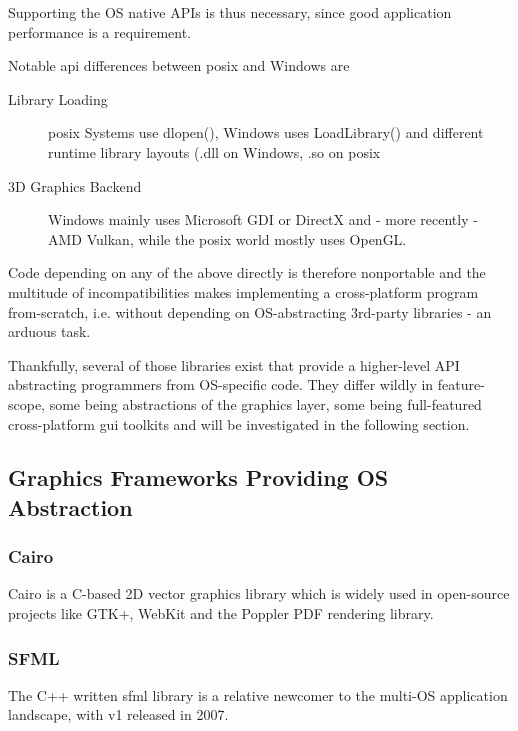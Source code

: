 Supporting the OS native APIs is thus necessary, since good application performance is a requirement.

Notable \gls{api} differences between \gls{posix} and Windows are
\begin{description}
	\item[Library Loading] \gls{posix} Systems use dlopen(), Windows uses LoadLibrary() and different runtime library layouts (.dll on Windows, .so on \gls{posix}
	\item[3D Graphics Backend] Windows mainly uses Microsoft GDI or DirectX and - more recently - AMD Vulkan, while the \gls{posix} world mostly uses OpenGL.
\end{description}

Code depending on any of the above directly is therefore nonportable and the multitude of incompatibilities makes implementing a cross-platform program from-scratch, i.e. without depending on OS-abstracting 3rd-party libraries - an arduous task.

Thankfully, several of those libraries exist that provide a higher-level API abstracting programmers from OS-specific code. They differ wildly in feature-scope, some being abstractions of the graphics layer, some being full-featured cross-platform \gls{gui} toolkits and will be investigated in the following section.

\subsection{Graphics Frameworks Providing OS Abstraction}
\label{sec:res_frameworks}

\subsubsection{Cairo}
\label{sec:cairo}
Cairo is a C-based 2D vector graphics library which is widely used in open-source projects like GTK+, WebKit and the Poppler PDF rendering library.

\subsubsection{SFML}
The C++ written \gls{sfml} library is a relative newcomer to the multi-OS application landscape, with v1 released in 2007.

